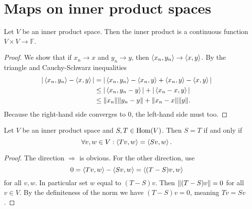 \section{Maps on inner product spaces}

\begin{lemma}
Let $V$ be an inner product space. Then the inner product is a continuous function $V\times V \to \mathbb{F}$.
\end{lemma}
\begin{proof}
We show that if $x_n \to x$ and $y_n \to y$, then $\left\langle x_n,y_n \right\rangle\to \left\langle x,y \right\rangle$. By the triangle and Cauchy-Schwarz inequalities
\begin{align*}
|\left\langle x_n,y_n \right\rangle-\left\langle x,y \right\rangle| &= |\left\langle x_n,y_n \right\rangle-\left\langle x_n,y \right\rangle+\left\langle x_n,y \right\rangle - \left\langle x,y \right\rangle| \\
&\leq |\left\langle x_n, y_n-y \right\rangle| + |\left\langle x_n-x, y \right\rangle| \\
&\leq \lVert x_n\rVert\lVert y_n-y\rVert + \lVert x_n-x\rVert\lVert y\rVert.
\end{align*}
Because the right-hand side converges to $0$, the left-hand side must too.
\end{proof}

\begin{lemma} \label{equalityOfMapsInnerProductSpaces}
Let $V$ be an inner product space and $S,T\in\operatorname{Hom}(V)$. Then $S=T$ \textup{if and only if}
\[ \forall v,w\in V: \left\langle Tv,w \right\rangle = \left\langle Sv,w \right\rangle. \]
\end{lemma}
\begin{proof}
The direction $\boxed{\Rightarrow}$ is obvious. For the other direction, use
\[ 0 = \left\langle Tv,w \right\rangle - \left\langle Sv,w \right\rangle = \left\langle (T-S)v,w \right\rangle \]
for all $v,w$. In particular set $w$ equal to $(T-S)v$. Then $\lVert(T-S)v\rVert = 0$ for all $v\in V$. By the definiteness of the norm we have $(T-S)v = 0$, meaning $Tv = Sv$.
\end{proof}

